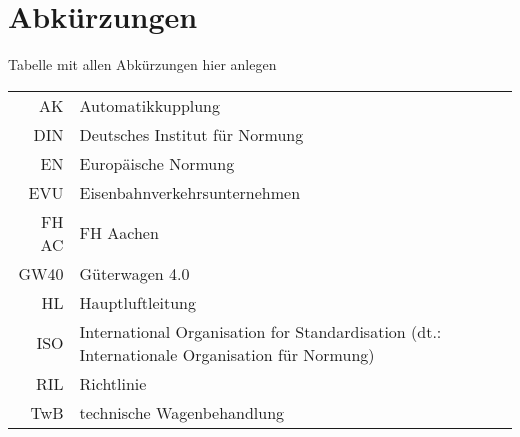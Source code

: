 \section{Abkürzungen}
Tabelle mit allen Abkürzungen hier anlegen\\
\begin{tabular}[c]{r|p{12cm}l}
	\hline
	AK		& 	Automatikkupplung	\\
	
	DIN		&	Deutsches Institut für Normung	\\
	
	EN		&	Europäische Normung	\\
	EVU		&	Eisenbahnverkehrsunternehmen\\
	
	FH AC 	& 	FH Aachen			\\
	
	GW40	&	Güterwagen 4.0		\\
	
	HL		&	Hauptluftleitung	\\
	
	ISO		&	International Organisation for Standardisation	(dt.: Internationale Organisation für Normung)\\
	
	RIL		&	Richtlinie			\\
	
	TwB		&	technische Wagenbehandlung	\\
	
	
	
	\hline
\end{tabular}